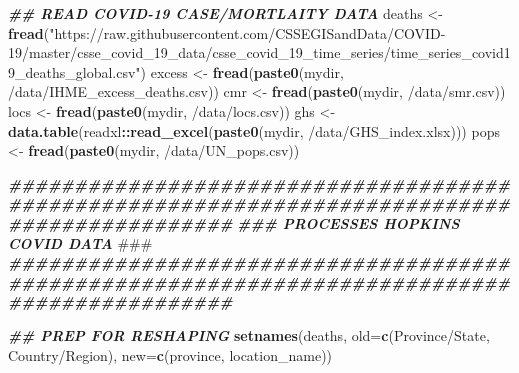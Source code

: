 \documentclass[
]{article}
\newenvironment{Shaded}{\begin{snugshade}}{\end{snugshade}}
\newcommand{\AlertTok}[1]{\textcolor[rgb]{0.94,0.16,0.16}{#1}}
\newcommand{\AttributeTok}[1]{\textcolor[rgb]{0.13,0.29,0.53}{#1}}
\newcommand{\DocumentationTok}[1]{\textcolor[rgb]{0.56,0.35,0.01}{\textbf{\textit{#1}}}}
\newcommand{\FunctionTok}[1]{\textcolor[rgb]{0.13,0.29,0.53}{\textbf{#1}}}
\newcommand{\NormalTok}[1]{#1}
\newcommand{\OtherTok}[1]{\textcolor[rgb]{0.56,0.35,0.01}{#1}}
\newcommand{\SpecialCharTok}[1]{\textcolor[rgb]{0.81,0.36,0.00}{\textbf{#1}}}
\newcommand{\StringTok}[1]{\textcolor[rgb]{0.31,0.60,0.02}{#1}}
\begin{document}
\begin{Shaded}
\begin{Highlighting}[]
\DocumentationTok{\#\# READ COVID{-}19 CASE/MORTLAITY DATA}
\NormalTok{deaths }\OtherTok{\textless{}{-}} \FunctionTok{fread}\NormalTok{(}\StringTok{"https://raw.githubusercontent.com/CSSEGISandData/COVID{-}19/master/csse\_covid\_19\_data/csse\_covid\_19\_time\_series/time\_series\_covid19\_deaths\_global.csv"}\NormalTok{)}
\NormalTok{excess }\OtherTok{\textless{}{-}} \FunctionTok{fread}\NormalTok{(}\FunctionTok{paste0}\NormalTok{(mydir, }\StringTok{\textquotesingle{}/data/IHME\_excess\_deaths.csv\textquotesingle{}}\NormalTok{))}
\NormalTok{cmr    }\OtherTok{\textless{}{-}} \FunctionTok{fread}\NormalTok{(}\FunctionTok{paste0}\NormalTok{(mydir, }\StringTok{\textquotesingle{}/data/smr.csv\textquotesingle{}}\NormalTok{))}
\NormalTok{locs   }\OtherTok{\textless{}{-}} \FunctionTok{fread}\NormalTok{(}\FunctionTok{paste0}\NormalTok{(mydir, }\StringTok{\textquotesingle{}/data/locs.csv\textquotesingle{}}\NormalTok{))}
\NormalTok{ghs    }\OtherTok{\textless{}{-}} \FunctionTok{data.table}\NormalTok{(readxl}\SpecialCharTok{::}\FunctionTok{read\_excel}\NormalTok{(}\FunctionTok{paste0}\NormalTok{(mydir, }\StringTok{\textquotesingle{}/data/GHS\_index.xlsx\textquotesingle{}}\NormalTok{)))}
\NormalTok{pops   }\OtherTok{\textless{}{-}} \FunctionTok{fread}\NormalTok{(}\FunctionTok{paste0}\NormalTok{(mydir, }\StringTok{\textquotesingle{}/data/UN\_pops.csv\textquotesingle{}}\NormalTok{))}

\DocumentationTok{\#\#\#\#\#\#\#\#\#\#\#\#\#\#\#\#\#\#\#\#\#\#\#\#\#\#\#\#\#\#\#\#\#\#\#\#\#\#\#\#\#\#\#\#\#\#\#\#\#\#\#\#\#\#\#\#\#\#\#\#\#\#\#\#\#\#\#\#\#\#\#\#\#\#\#\#\#\#\#\#\#\#\#\#\#\#\#\#\#\#\#\#\#}
\DocumentationTok{\#\#\#                               PROCESSES HOPKINS COVID DATA                            }\AlertTok{\#\#\#}
\DocumentationTok{\#\#\#\#\#\#\#\#\#\#\#\#\#\#\#\#\#\#\#\#\#\#\#\#\#\#\#\#\#\#\#\#\#\#\#\#\#\#\#\#\#\#\#\#\#\#\#\#\#\#\#\#\#\#\#\#\#\#\#\#\#\#\#\#\#\#\#\#\#\#\#\#\#\#\#\#\#\#\#\#\#\#\#\#\#\#\#\#\#\#\#\#\#}

\DocumentationTok{\#\# PREP FOR RESHAPING}
\FunctionTok{setnames}\NormalTok{(deaths, }\AttributeTok{old=}\FunctionTok{c}\NormalTok{(}\StringTok{\textquotesingle{}Province/State\textquotesingle{}}\NormalTok{, }\StringTok{\textquotesingle{}Country/Region\textquotesingle{}}\NormalTok{), }\AttributeTok{new=}\FunctionTok{c}\NormalTok{(}\StringTok{\textquotesingle{}province\textquotesingle{}}\NormalTok{, }\StringTok{\textquotesingle{}location\_name\textquotesingle{}}\NormalTok{))}


\end{Highlighting}
\end{Shaded}
\end{document}

